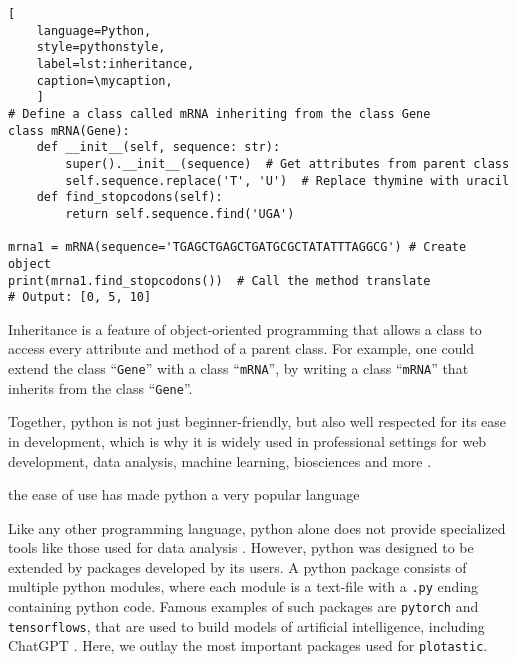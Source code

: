 \def\mycaption{ Example of inheritance in python.
    The class ``\texttt{mRNA}'' inherits from the class ``\texttt{Gene}''. The class
    ``\texttt{mRNA}'' has two methods, ``\texttt{\_\_init\_\_}'' and
    ``\texttt{find\_stopcodon}''. The method ``\texttt{find\_stopcodon}'' finds the
    position of stop codons. }
\begin{lstlisting}[
    language=Python,
    style=pythonstyle,
    label=lst:inheritance,
    caption=\mycaption,
    ]
# Define a class called mRNA inheriting from the class Gene
class mRNA(Gene):
    def __init__(self, sequence: str):
        super().__init__(sequence)  # Get attributes from parent class
        self.sequence.replace('T', 'U')  # Replace thymine with uracil
    def find_stopcodons(self):
        return self.sequence.find('UGA')

mrna1 = mRNA(sequence='TGAGCTGAGCTGATGCGCTATATTTAGGCG') # Create object
print(mrna1.find_stopcodons())  # Call the method translate
# Output: [0, 5, 10]
\end{lstlisting}

Inheritance is a feature of object-oriented programming that allows
a class to access every attribute and method of a parent class. For example, one
could extend the class ``\texttt{Gene}'' with a class ``\texttt{mRNA}'', by
writing a class ``\texttt{mRNA}'' that inherits from the class ``\texttt{Gene}''.

Together, python is not just beginner-friendly, but also well respected for its
ease in development, which is why it is widely used in professional settings for
web development, data analysis, machine learning, biosciences and more \cite{ekmekciIntroductionProgrammingBioscientists2016}.

the ease of use has made python a very popular language~\cite{rayhanRisePythonSurvey2023}

Like any other programming language, python alone does not provide specialized
tools like those used for data analysis \cite{PythonLanguageReference}. However,
python was designed to be extended by packages developed by its users. A python
package consists of multiple python modules, where each module is a text-file
with a \texttt{.py} ending containing python code. Famous examples of such
packages are \texttt{pytorch} and \texttt{tensorflows}, that are used to build
models of artificial intelligence, including ChatGPT
\cite{paszkePyTorchImperativeStyle2019, abadiTensorFlowLargeScaleMachine2016,
    radfordLanguageModelsAre2019}. Here, we outlay the most important packages used
for \texttt{plotastic}.

